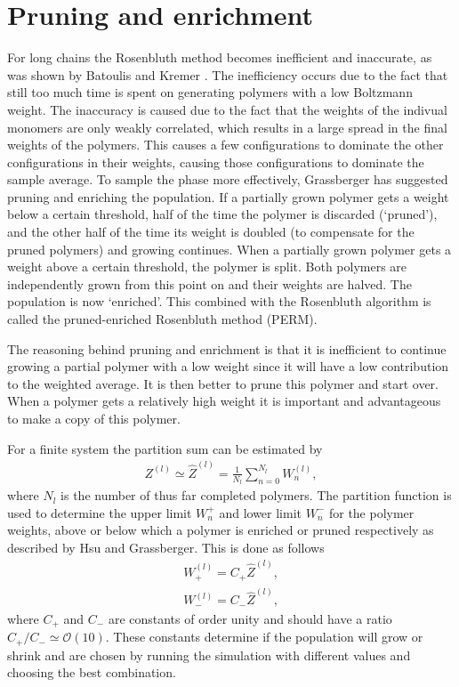 \section{Pruning and enrichment}
For long chains the Rosenbluth method becomes inefficient and inaccurate, as was shown by Batoulis and Kremer \cite{batoulis1988statistical}. The inefficiency occurs due to the fact that still too much time is spent on generating polymers with a low Boltzmann weight. The inaccuracy is caused due to the fact that the weights of the indivual monomers are only weakly correlated, which results in a large spread in the final weights of the polymers. This causes a few configurations to dominate the other configurations in their weights, causing those configurations to dominate the sample average. To sample the phase more effectively, Grassberger has suggested pruning and enriching the population. If a partially grown polymer gets a weight below a certain threshold, half of the time the polymer is discarded (`pruned'), and the other half of the time its weight is doubled (to compensate for the pruned polymers) and growing continues. When a partially grown polymer gets a weight above a certain threshold, the polymer is split. Both polymers are independently grown from this point on and their weights are halved. The population is now `enriched'. This combined with the Rosenbluth algorithm is called the pruned-enriched Rosenbluth method (PERM).

The reasoning behind pruning and enrichment is that it is inefficient to continue growing a partial polymer with a low weight since it will have a low contribution to the weighted average. It is then better to prune this polymer and start over. When a polymer gets a relatively high weight it is important and advantageous to make a copy of this polymer.


For a finite system the partition sum can be estimated\cite{hsu2011review} by 
\begin{gather*}
    Z^{(l)} \simeq \hat{Z}^{(l)}
    = \frac{1}{N_l} \sum_{n=0}^{N_l}W_n^{(l)},
\end{gather*} where $N_l$ is the number of thus far completed polymers. The partition function is used to determine the upper limit $W_n^+$ and lower limit $W_n^-$ for the polymer weights, above or below which a polymer is enriched or pruned respectively as described by Hsu and Grassberger\cite{hsu2011review}. This is done as follows
\begin{gather*}
    W_+^{(l)} = C_+\hat{Z}^{(l)},\\
    W_-^{(l)} = C_-\hat{Z}^{(l)},
\end{gather*} where $C_+$ and $C_-$ are constants of order unity and should have a ratio $C_+/C_- \simeq \mathcal{O}(10)$. These constants determine if the population will grow or shrink and are chosen by running the simulation with different values and choosing the best combination.

